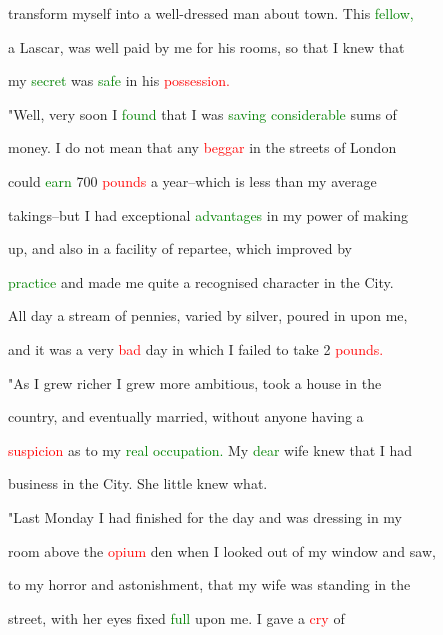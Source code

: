  transform myself into a well-dressed man about town. This \textcolor{green}{fellow,}

 a Lascar, was well paid by me for his rooms, so that I knew that

 my \textcolor{green}{secret} was \textcolor{green}{safe} in his \textcolor{red}{possession.}



 "Well, very soon I \textcolor{green}{found} that I was \textcolor{green}{saving} \textcolor{green}{considerable} sums of

 \textcolor{BurntOrange}{money.} I do not mean that any \textcolor{red}{beggar} in the streets of London

 could \textcolor{green}{earn} 700 \textcolor{red}{pounds} a year--which is less than my average

 takings--but I had exceptional \textcolor{green}{advantages} in my power of making

 up, and also in a facility of repartee, which \textcolor{BurntOrange}{improved} by

 \textcolor{green}{practice} and made me quite a recognised character in the City.

 All day a stream of pennies, varied by silver, poured in upon me,

 and it was a very \textcolor{red}{bad} day in which I failed to take 2 \textcolor{red}{pounds.}



 "As I \textcolor{BurntOrange}{grew} richer I \textcolor{BurntOrange}{grew} more ambitious, took a house in the

 country, and eventually married, without anyone having a

 \textcolor{red}{suspicion} as to my \textcolor{green}{real} \textcolor{green}{occupation.} My \textcolor{green}{dear} wife knew that I had

 business in the City. She little knew what.



 "Last Monday I had finished for the day and was dressing in my

 room above the \textcolor{red}{opium} den when I looked out of my window and saw,

 to my \textcolor{BurntOrange}{horror} and \textcolor{BurntOrange}{astonishment,} that my wife was standing in the

 street, with her eyes fixed \textcolor{green}{full} upon me. I gave a \textcolor{red}{cry} of

